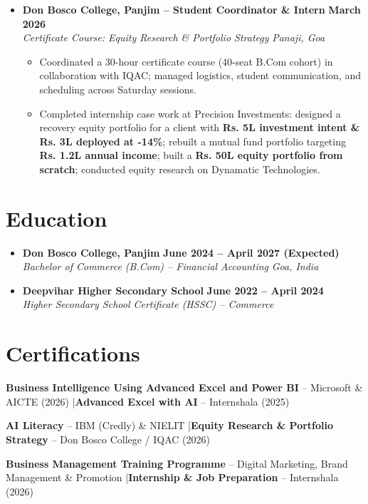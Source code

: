 \documentclass[9pt, letterpaper]{article}
\newcommand{\resumeItem}[1]{\item\small{#1}}
\newcommand{\resumeSubheading}[4]{
  \item[]
  \textbf{#1} \hfill \textbf{#2} \\
  \textit{#3} \hfill \textit{#4}
}
\begin{document}
\begin{itemize}[leftmargin=0em, label={}]
  \resumeSubheading
    {Don Bosco College, Panjim – Student Coordinator \& Intern}{March 2026}
    {Certificate Course: Equity Research \& Portfolio Strategy}{Panaji, Goa}
  \begin{itemize}
    \resumeItem{Coordinated a 30-hour certificate course (40-seat B.Com cohort) in collaboration with IQAC; managed logistics, student communication, and scheduling across Saturday sessions.}
    \resumeItem{Completed internship case work at Precision Investments: designed a recovery equity portfolio for a client with \textbf{Rs. 5L investment intent \& Rs. 3L deployed at -14\%}; rebuilt a mutual fund portfolio targeting \textbf{Rs. 1.2L annual income}; built a \textbf{Rs. 50L equity portfolio from scratch}; conducted equity research on Dynamatic Technologies.}
  \end{itemize}

\end{itemize}

\section{Education}

\begin{itemize}[leftmargin=0em, label={}]
  \resumeSubheading
    {Don Bosco College, Panjim}{June 2024 – April 2027 (Expected)}
    {Bachelor of Commerce (B.Com) – Financial Accounting}{Goa, India}

  \vspace{1pt}

  \resumeSubheading
    {Deepvihar Higher Secondary School}{June 2022 – April 2024}
    {Higher Secondary School Certificate (HSSC) – Commerce}{}
\end{itemize}

\section{Certifications}
\begin{itemize}[leftmargin=0em, label={}]
\small{
\item \textbf{Business Intelligence Using Advanced Excel and Power BI} – Microsoft \& AICTE (2026) \quad|\quad \textbf{Advanced Excel with AI} – Internshala (2025)
\item \textbf{AI Literacy} – IBM (Credly) \& NIELIT \quad|\quad \textbf{Equity Research \& Portfolio Strategy} – Don Bosco College / IQAC (2026)
\item \textbf{Business Management Training Programme} – Digital Marketing, Brand Management \& Promotion \quad|\quad \textbf{Internship \& Job Preparation} – Internshala (2026)
}
\end{itemize}
\end{document}
